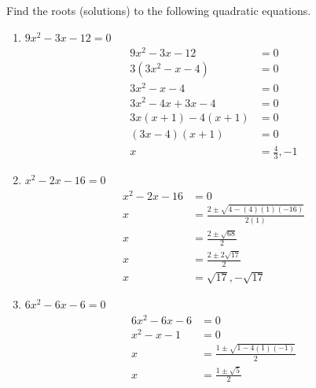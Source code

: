 \documentclass[12pt]{article}
\begin{document}
Find the roots (solutions) to the following quadratic equations.
\begin{enumerate}
    \item $9x^2 - 3x - 12=0$
    \begin{align*}
        9x^2 - 3x - 12 &=0
        \\ 3(3x^2 - x- 4) &= 0
        \\ 3x^2 - x- 4 &= 0
        \\ 3x^2 - 4x + 3x - 4 &= 0
        \\ 3x(x +1) -4(x+1) &= 0
        \\ (3x-4)(x+1) &= 0 
        \\ x&= \frac{4}{3}, -1
    \end{align*}
    
    \item $x^2 - 2x -16 =0$
    \begin{align*}
        x^2 - 2x -16 &=0
        \\ x &= \frac{2 \pm \sqrt{4 - (4)(1)(-16)}}{2(1)}
        \\ x&=  \frac{2 \pm \sqrt{68}}{2}
        \\ x&=  \frac{2 \pm 2 \sqrt{17}}{2}
        \\ x&= \sqrt{17}, -\sqrt{17}
    \end{align*}
    \item $6x^2 - 6x -6=0$
    \begin{align*}
        6x^2 - 6x -6 & =0
        \\ x^2 -x -1 &= 0
        \\ x&= \frac{1 \pm \sqrt{1 - 4(1)(-1)}}{2}
        \\ x&= \frac{1\pm \sqrt{5}}{2}
    \end{align*}
\end{enumerate}
\end{document}
